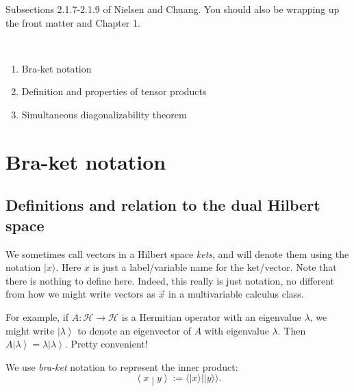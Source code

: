 \documentclass{article}
\newcommand{\ket}[1]{|#1\rangle}
\newcommand{\braket}[2]{\langle#1|#2\rangle}
\begin{document}
\noindent
{}

\vspace{.3cm}

 Subsections 2.1.7-2.1.9 of Nielsen and Chuang.  You should also be wrapping up the front matter and Chapter 1.

\

\begin{enumerate}
\item Bra-ket notation
\item Definition and properties of tensor products
\item Simultaneous diagonalizability theorem
\end{enumerate}

\section{Bra-ket notation}

\subsection{Definitions and relation to the dual Hilbert space} 

We sometimes call vectors in a Hilbert space \emph{kets}, and will denote them using the notation $\ket{x}$.
Here $x$ is just a label/variable name for the ket/vector.
Note that there is nothing to define here.
Indeed, this really is just notation, no different from how we might write vectors as $\vec{x}$ in a multivariable calculus class.

For example, if $A: \mathscr{H} \to  \mathscr{H}$ is a Hermitian operator with an eigenvalue $\lambda$, we might write $\left| \lambda \right\rangle $ to denote an eigenvector of $A$ with eigenvalue $\lambda$. Then  $A \left| \lambda \right\rangle  = \lambda \left| \lambda \right\rangle$.  Pretty convenient!

We use \emph{bra-ket} notation to represent the inner product:
\[ \left\langle x \middle| y \right\rangle := \braket{\ket{x}}{\ket{y}}.\]
\end{document}
